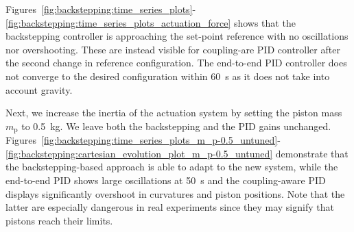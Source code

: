 Figures~\ref{fig:backstepping:time_series_plots}-\ref{fig:backstepping:time_series_plots_actuation_force} shows that the backstepping controller is approaching the set-point reference with no oscillations nor overshooting. These are instead visible for coupling-are PID controller after the second change in reference configuration. 
The end-to-end PID controller does not converge to the desired configuration within \SI{60}{s} as it does not take into account gravity.

Next, we increase the inertia of the actuation system by setting the piston mass $m_\mathrm{p}$ to \SI{0.5}{kg}. We leave both the backstepping and the PID gains unchanged. Figures~\ref{fig:backstepping:time_series_plots_m_p-0.5_untuned}-\ref{fig:backstepping:cartesian_evolution_plot_m_p-0.5_untuned} demonstrate that the backstepping-based approach is able to adapt to the new system, while the end-to-end PID shows large oscillations at \SI{50}{s} and the coupling-aware PID displays significantly overshoot in curvatures and piston positions. 
Note that the latter are especially dangerous in real experiments since they may signify that pistons reach their limits.

